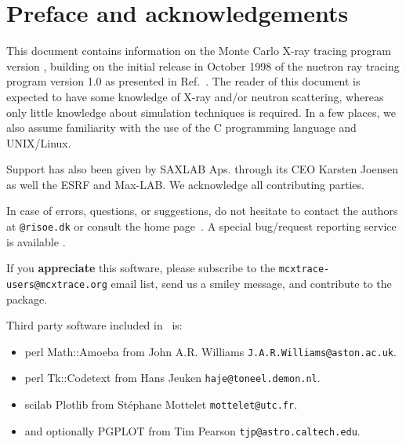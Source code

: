 
\chapter*{Preface and acknowledgements}
This document contains information on the Monte Carlo
X-ray tracing program \MCX version \version, building on the initial
release in October 1998 of the nuetron ray tracing program \MCX version 1.0 as presented in Ref.~\cite{nn_10_20}. The reader of this
document is expected to have some knowledge of X-ray and/or neutron scattering,
whereas only little knowledge about simulation techniques is
required. In a few places, we also assume familiarity with the
use of the C programming language and UNIX/Linux.

Support has also been given by SAXLAB Aps. through its CEO Karsten Joensen as well 
the ESRF and Max-LAB. We acknowledge all contributing parties. 


In case of errors, questions, or suggestions,
do not hesitate to
contact the authors at \verb+@risoe.dk+
or consult the \MCX home page~\cite{mcxtrace_webpage}.
A special bug/request reporting service is available \cite{mczilla_webpage}.

If you {\bf appreciate} this software, please subscribe to the \verb+mcxtrace-users@mcxtrace.org+ email list, send us a smiley message, and contribute to the package. 




Third party software included in \MCX\ is:
\begin{itemize}
\item perl Math::Amoeba from John A.R. Williams \verb+J.A.R.Williams@aston.ac.uk+.
\item perl Tk::Codetext from Hans Jeuken \verb+haje@toneel.demon.nl+.
\item scilab Plotlib from St\'ephane Mottelet \verb+mottelet@utc.fr+.
\item and optionally PGPLOT from Tim Pearson \verb+tjp@astro.caltech.edu+.
\end{itemize}

